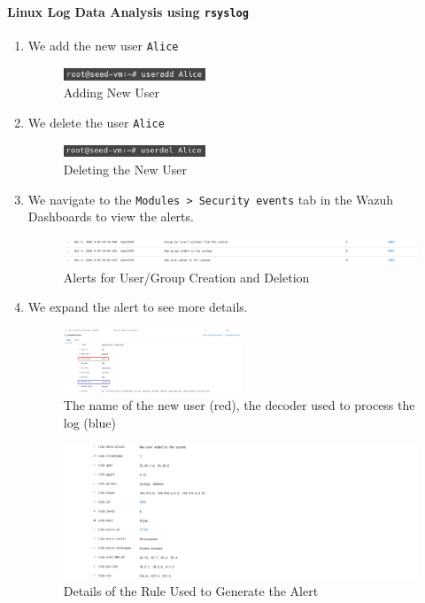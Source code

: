 \paragraph{Linux Log Data Analysis using \texttt{rsyslog}}
\begin{enumerate}
    \item We add the new user \texttt{Alice}
    \begin{figure} [H]
    \centering
    \includegraphics[width=0.4\textwidth]{images/log-data/7.png}
    \caption{Adding New User}
    \end{figure}
    \item We delete the user \texttt{Alice}
    \begin{figure} [H]
    \centering
    \includegraphics[width=0.4\textwidth]{images/log-data/8.png}
    \caption{Deleting the New User}
    \end{figure}
    \item We navigate to the \texttt{Modules > Security events} tab in the Wazuh Dashboards to view the alerts. 
    \begin{figure} [H]
    \centering
    \includegraphics[width=\textwidth]{images/log-data/4.png}
    \caption{Alerts for User/Group Creation and Deletion}
    \end{figure}
    \item We expand the alert to see more details.
    \begin{figure} [H]
    \centering
    \includegraphics[width=0.5\textwidth]{images/log-data/5.png}
    \caption{The name of the new user (red), the decoder used to process the log (blue)}
    \end{figure}
    \begin{figure} [H]
    \centering
    \includegraphics[width=\textwidth]{images/log-data/6.png}
    \caption{Details of the Rule Used to Generate the Alert}
    \end{figure}
\end{enumerate}


